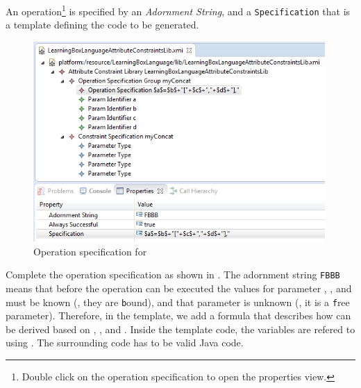 An operation\footnote{Double click on the operation specification to open the properties view.} is specified by an \emph{Adornment String}, and a \texttt{Specification} that is a template defining the code to be generated.

\begin{figure}[htbp]
\begin{center}
  \includegraphics[width=0.99\textwidth]{../../org.moflon.doc.handbook.03_storyDiagrams/13_complexAttributeConstraints/visCACImages/ea_CAC_opSpec}
  \caption{Operation specification for }  
  \label{ea_CAC_opSpec}
\end{center}
\end{figure}

\begin{stepbystep}
\item Complete the operation specification as shown in . The adornment string \texttt{FBBB} means that before the operation can be executed the values for parameter , , and  must be known (\idest, they are \texttt{b}ound), and that parameter  is unknown (\idest, it is a \texttt{f}ree parameter).
Therefore, in the  template, we add a formula that describes how  can be derived based on , , and .
Inside the template code, the variables are refered to using \entity{\$}.
The surrounding code has to be valid Java code.
\end{stepbystep}

